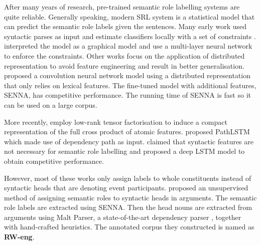 \documentclass[a4paper]{article}
\begin{document}
After many years of research, pre-trained semantic role labelling systems are quite reliable. Generally speaking, modern SRL system is a statistical model that can predict the semantic role labels given the sentences. Many early work used syntactic parses as input and estimate classifiers locally with a set of constraints \citep{punyakanok2008importance}. \citet{tackstrom2015efficient} interpreted the model as a graphical model and use a multi-layer neural network to enforce the constraints. Other works focus on the application of distributed representation to avoid feature engineering and result in better generalisation. \citet{collobert2007fast, collobert2011natural} proposed a convolution neural network model using a distributed representation that only relies on lexical features. The fine-tuned model with additional features, SENNA, has competitive performance. The running time of SENNA is fast so it can be used on a large corpus. 
% 
% 
% 
%


More recently, \citet{lei-EtAl:2015:NAACL-HLT} employ low-rank tensor factorisation to induce a compact representation of the full cross product of atomic features. \citet{roth2016neural} proposed PathLSTM which made use of dependency path as input. \citet{marcheggiani2017simple} claimed that syntactic features are not necessary for semantic role labelling and proposed a deep LSTM model to obtain competitive performance. 

However, most of these works only assign labels to whole constituents instead of syntactic heads that are denoting event participants. \citet{SayeedEtAl2015} proposed an unsupervised method of assigning semantic roles to syntactic heads in arguments. The semantic role labels are extracted using SENNA. Then the head nouns are extracted from arguments using Malt Parser, a state-of-the-art dependency parser \citep{nivre2006maltparser}, together with hand-crafted heuristics. The annotated corpus they constructed is named as \textbf{RW-eng}. 
\end{document}
